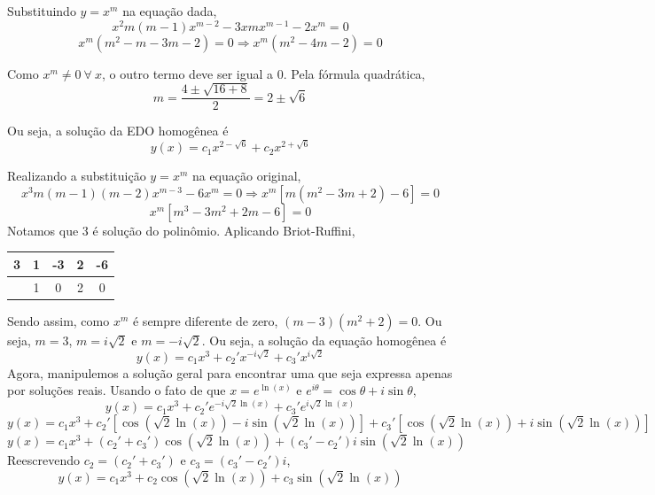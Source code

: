 \documentclass[oneside,12pt,a4paper]{report}
\begin{document}
\begin{resolucao}
    \itemresolucao Substituindo $y=x^m$ na equação dada,
    \[x^2m(m-1)x^{m-2}-3xmx^{m-1}-2x^m=0\]
    \[x^m(m^2-m-3m-2)=0\Rightarrow x^m(m^2-4m-2)=0\]

    Como $x^m\neq0~\forall~x$, o outro termo deve ser igual a 0. Pela fórmula quadrática,
    \[m=\frac{4\pm\sqrt{16+8}}{2}=2\pm\sqrt{6}\]

    Ou seja, a solução da EDO homogênea é
    \[\boxed{y(x)=c_1x^{2-\sqrt{6}}+c_2x^{2+\sqrt{6}}}\]

    \itemresolucao Realizando a substituição $y=x^m$ na equação original,
    \[x^3m(m-1)(m-2)x^{m-3}-6x^m=0\Rightarrow x^m[m(m^2-3m+2)-6]=0\]
    \[x^m[m^3-3m^2+2m-6]=0\]
    Notamos que 3 é solução do polinômio. Aplicando Briot-Ruffini,
    \begin{table}[H]
        \centering
        \begin{tabular}{c|cccc}
            3 & 1 & -3 & 2 & -6\\
            \hline
              & 1 & 0 & 2 & 0
        \end{tabular}
    \end{table}
    Sendo assim, como $x^m$ é sempre diferente de zero, $(m-3)(m^2+2)=0$. Ou seja, $m=3$, $m=i\sqrt{2}$ e $m=-i\sqrt{2}$. Ou seja, a solução da equação homogênea é
    \[y(x)=c_1x^3+c_2'x^{-i\sqrt{2}}+c_3'x^{i\sqrt{2}}\]
    Agora, manipulemos a solução geral para encontrar uma que seja expressa apenas por soluções reais. Usando o fato de que $x=e^{\ln(x)}$ e $e^{i\theta}=\cos\theta+i\sin\theta$,
    \[y(x)=c_1x^3+c_2'e^{-i\sqrt{2}\ln (x)}+c_3'e^{i\sqrt{2}\ln (x)}\]
    \[y(x)=c_1x^3+c_2'[\cos(\sqrt{2}\ln(x))-i\sin(\sqrt{2}\ln(x))]+c_3'[\cos(\sqrt{2}\ln(x))+i\sin(\sqrt{2}\ln(x))]\]
    \[y(x)=c_1x^3+(c_2'+c_3')\cos(\sqrt{2}\ln(x))+(c_3'-c_2')i\sin(\sqrt{2}\ln(x))\]
    Reescrevendo $c_2=(c_2'+c_3')$ e $c_3=(c_3'-c_2')i$,
    \[\boxed{y(x)=c_1x^3+c_2\cos(\sqrt{2}\ln(x))+c_3\sin(\sqrt{2}\ln(x))}\]


\end{resolucao}
\end{document}
